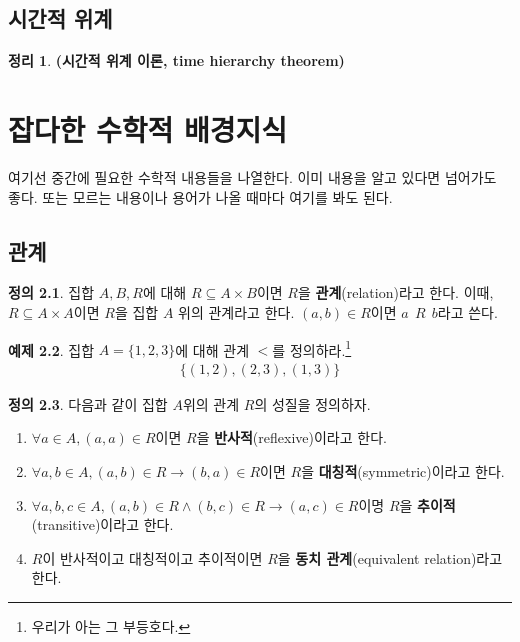 \documentclass[b5paper, 11pt]{book}
\theoremstyle{definition}
\newtheorem{defn}{정의}[chapter]
\newtheorem{thm}[defn]{정리}
\newtheorem{ex}[defn]{예제}
\newenvironment{pf*}{\pushQED{\qed}\pf}
{\popQED\endpf}
\begin{document}
\section{시간적 위계}
\begin{thm}
    \textbf{(시간적 위계 이론, time hierarchy theorem)}
\end{thm}
\begin{pf*}
    
\end{pf*}
\appendix
\chapter{잡다한 수학적 배경지식}
여기선 중간에 필요한 수학적 내용들을 나열한다. 
이미 내용을 알고 있다면 넘어가도 좋다. 또는 모르는 내용이나 용어가 나올 때마다 여기를 
봐도 된다.
\section{관계}
\begin{defn}
    집합 $A, B, R$에 대해 $R \subseteq A \times B$이면 $R$을 \textbf{관계}(relation)라고 한다.
    이때, $R \subseteq A \times A$이면 $R$을 집합 $A$ 위의 관계라고 한다. 
    $(a, b) \in R$이면 $a \;\, R \;\, b$라고 쓴다.
\end{defn}
\begin{ex}
    집합 $A = \{1, 2, 3\}$에 대해 관계 $<$를 정의하라.\footnote{우리가 아는 그 부등호다.}
    \begin{align*}
        \{(1, 2), (2, 3), (1, 3)\}
    \end{align*}
\end{ex}
\begin{defn}
    다음과 같이 집합 $A$위의 관계 $R$의 성질을 정의하자.
    \begin{enumerate}
        \item $\forall a \in A, (a, a) \in R$이면 $R$을 \textbf{반사적}(reflexive)이라고 한다.
        \item $\forall a, b \in A, (a, b) \in R \rightarrow (b, a) \in R$이면
        $R$을 \textbf{대칭적}(symmetric)이라고 한다.
        \item $\forall a, b, c\in A, (a, b) \in R \wedge (b, c) \in R \rightarrow 
        (a, c) \in R$이명 $R$을 \textbf{추이적}(transitive)이라고 한다.
        \item $R$이 반사적이고 대칭적이고 추이적이면 $R$을 \textbf{동치 관계}(equivalent relation)라고
        한다.
    \end{enumerate}
\end{defn}
\end{document}
